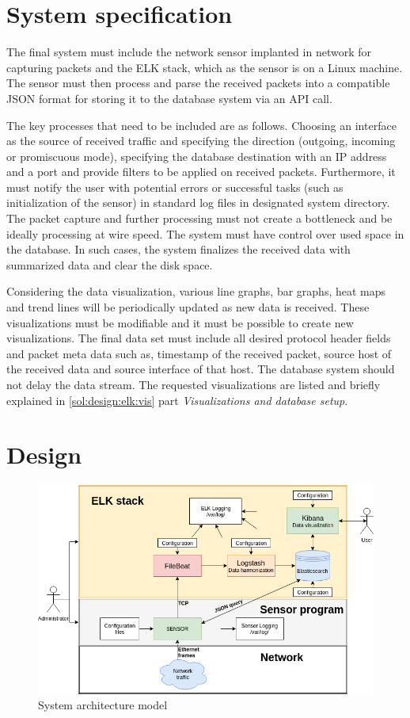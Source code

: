 \documentclass[12pt,a4paper,twoside]{report}
\begin{document}
	\section{System specification} \label{solution:spec}
		The final system must include the network sensor implanted in network for capturing packets and the ELK stack, which as the sensor is on a Linux machine. The sensor must then process and parse the received packets into a compatible JSON format for storing it to the database system via an API call.\par
		The key processes that need to be included are as follows. Choosing an interface as the source of received traffic and specifying the direction (outgoing, incoming or promiscuous mode), specifying the database destination with an IP address and a port and provide filters to be applied on received packets. Furthermore, it must notify the user with potential errors or successful tasks (such as initialization of the sensor) in standard log files in designated system directory. The packet capture and further processing must not create a bottleneck and be ideally processing at wire speed. The system must have control over used space in the database. In such cases, the system finalizes the received data with summarized data and clear the disk space.\par
		Considering the data visualization, various line graphs, bar graphs, heat maps and trend lines will be periodically updated as new data is received. These visualizations must be modifiable and it must be possible to create new visualizations. The final data set must include all desired protocol header fields and packet meta data such as, timestamp of the received packet, source host of the received data and source interface of that host. The database system should not delay the data stream. The requested visualizations are listed and briefly explained in \autoref{sol:design:elk:vis} part \emph{Visualizations and database setup}.
	\section{Design} \label{solution:design}
		\begin{figure}
			\centering
			\includegraphics[scale=0.5]{architecture}
			\caption{System architecture model}
			\label{figure:sol:architecture}
		\end{figure}
\end{document}
